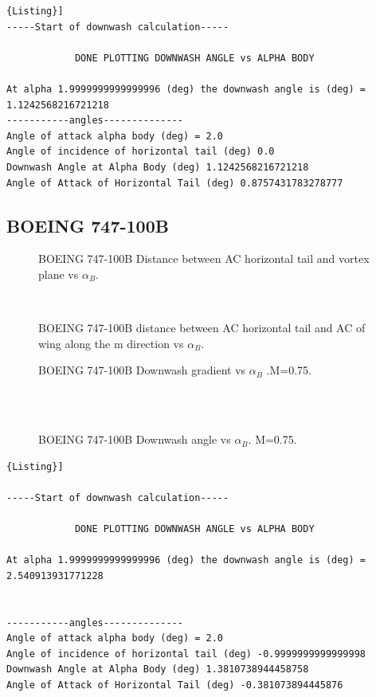 \begin{lstlisting}[caption={{\footnotesize Downwash estimation - Results. ATR 72}},label= [style=\bfseries]{Listing}]
-----Start of downwash calculation-----

			DONE PLOTTING DOWNWASH ANGLE vs ALPHA BODY

At alpha 1.9999999999999996 (deg) the downwash angle is (deg) = 1.1242568216721218
-----------angles-------------- 
Angle of attack alpha body (deg) = 2.0
Angle of incidence of horizontal tail (deg) 0.0
Downwash Angle at Alpha Body (deg) 1.1242568216721218
Angle of Attack of Horizontal Tail (deg) 0.8757431783278777
\end{lstlisting}

\subsection{BOEING 747-100B}
\begin{figure}[H]
\centering

\caption{BOEING 747-100B Distance between AC horizontal tail and vortex plane vs $\alpha_{B}$.}
\label{fig:zATR}
\end{figure}
\noindent \\
\begin{figure}[H]
\centering

\caption{BOEING 747-100B distance between AC horizontal tail and AC of wing along the m direction vs $\alpha_{B}$.}
\label{fig:zboeing}
\end{figure}


\begin{figure}[H]
\centering

\caption{BOEING 747-100B  Downwash gradient vs $\alpha_{B}$ .M=0.75.}
\label{fig:downwashgradboeing}
\end{figure}
\noindent \\ \\ 
\begin{figure}[H]
\centering

\caption{BOEING 747-100B Downwash angle vs $\alpha_{B}$. M=0.75.}
\label{fig:epsilonboeing}
\end{figure}





\newpage

\begin{lstlisting}[caption={{\footnotesize Downwash estimation - Results. BOEING 747-100B}},label= [style=\bfseries]{Listing}]

-----Start of downwash calculation-----

			DONE PLOTTING DOWNWASH ANGLE vs ALPHA BODY

At alpha 1.9999999999999996 (deg) the downwash angle is (deg) = 2.540913931771228

 
-----------angles-------------- 
Angle of attack alpha body (deg) = 2.0
Angle of incidence of horizontal tail (deg) -0.9999999999999998
Downwash Angle at Alpha Body (deg) 1.3810738944458758
Angle of Attack of Horizontal Tail (deg) -0.381073894445876
\end{lstlisting}


